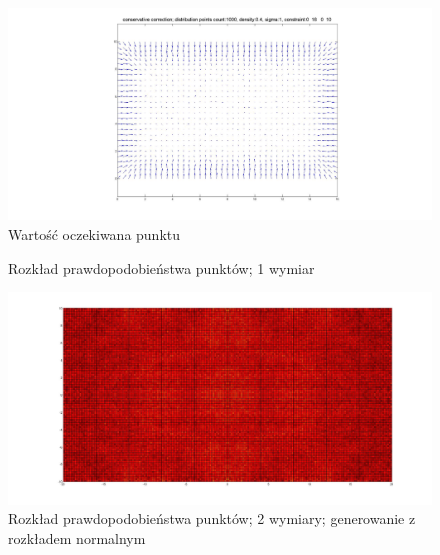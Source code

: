 \documentclass{mini}
\begin{document}
\begin{figure}[H]
\centering
\includegraphics[width=\textwidth]{conservative2dprzesuniecie}
\caption{Wartość oczekiwana punktu}
\end{figure}

\begin{figure}[H]
\centering
{}
\quad
{}
\caption{Rozkład prawdopodobieństwa punktów; 1 wymiar}
\end{figure}

\begin{figure}[H]
\centering
\includegraphics[width=\textwidth]{c_n_10M_2__20_20__10_10_4}
\caption{Rozkład prawdopodobieństwa punktów; 2 wymiary; generowanie z rozkładem normalnym}
\end{figure}
\end{document}
